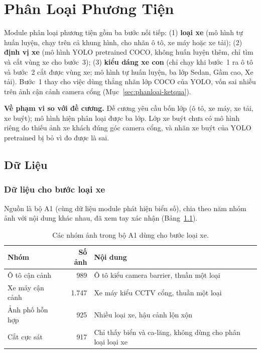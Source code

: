 \chapter{Phân Loại Phương Tiện}
\label{ch:phanloai}

Module phân loại phương tiện gồm ba bước nối tiếp: (1) \textbf{loại xe} (mô hình tự huấn
luyện, chạy trên cả khung hình, cho nhãn ô tô, xe máy hoặc xe tải); (2) \textbf{định vị xe}
(mô hình YOLO pretrained COCO, không huấn luyện thêm, chỉ tìm và cắt vùng xe cho bước~3);
(3) \textbf{kiểu dáng xe con} (chỉ chạy khi bước~1 ra ô tô và bước~2 cắt được vùng xe; mô
hình tự huấn luyện, ba lớp Sedan, Gầm cao, Xe tải). Bước~1 thay cho việc dùng
thẳng nhãn lớp COCO của YOLO, vốn sai nhiều trên ảnh cận cảnh camera cổng
(Mục~\ref{sec:phanloai-ketqua}).

\textbf{Về phạm vi so với đề cương.} Đề cương yêu cầu bốn lớp (ô tô, xe máy, xe tải, xe
buýt); mô hình hiện phân loại được ba lớp. Lớp xe buýt chưa có mô hình riêng do thiếu ảnh xe
khách đúng góc camera cổng, và nhãn xe buýt của YOLO pretrained bị bỏ vì đo được là sai.

\section{Dữ Liệu}
\label{sec:phanloai-dulieu}

\subsection{Dữ liệu cho bước loại xe}

Nguồn là bộ A1 (cùng dữ liệu module phát hiện biển số), chia theo năm nhóm ảnh với nội dung
khác nhau, đã xem tay xác nhận (Bảng~\ref{tab:vt-sources}).

\begin{table}[htbp]
\centering
\caption{Các nhóm ảnh trong bộ A1 dùng cho bước loại xe.}
\label{tab:vt-sources}

\begin{tabular}{lrp{7.5cm}}
\toprule
\textbf{Nhóm} & \textbf{Số ảnh} & \textbf{Nội dung} \\
\midrule
Ô tô cận cảnh & 989 & Ô tô kiểu camera barrier, thuần một loại \\
Xe máy cận cảnh & 1.747 & Xe máy kiểu CCTV cổng, thuần một loại \\
Ảnh phố hỗn hợp & 925 & Nhiều loại xe, hậu cảnh lộn xộn \\
Cắt cực sát & 917 & Chỉ thấy biển và ca-lăng, không dùng cho phân loại loại xe \\
\bottomrule
\end{tabular}
\end{table}

